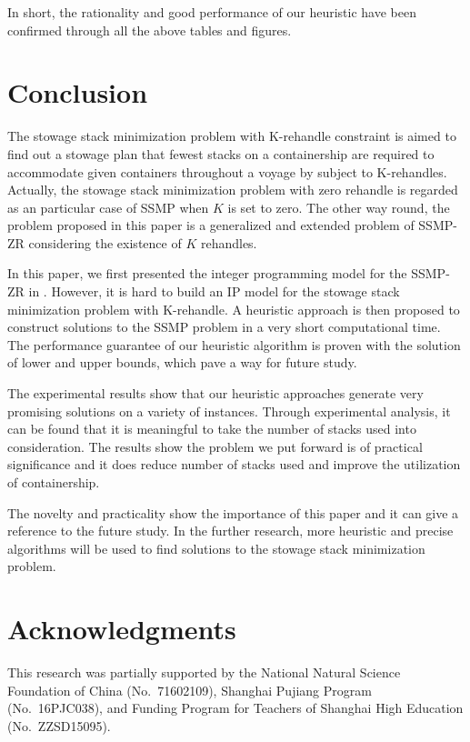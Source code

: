 \documentclass[review,3p,times,authoryear,12pt]{elsarticle}
\begin{document}
In short, the rationality and good performance of our heuristic have been confirmed through all the above tables and figures.

\section{Conclusion}
\label{sec:con}
The stowage stack minimization problem with K-rehandle constraint is aimed to find out a stowage plan that fewest stacks on a containership are required to accommodate given containers throughout a voyage by subject to K-rehandles.
Actually, the stowage stack minimization problem with zero rehandle is regarded as an particular case of SSMP when $K$ is set to zero.
The other way round, the problem proposed in this paper is a generalized and extended problem of SSMP-ZR considering the existence of $K$ rehandles.

In this paper, we first presented the integer programming model for the SSMP-ZR in \cite{wang2014stowage}.
However, it is hard to build an IP model for the stowage stack minimization problem with K-rehandle.
A heuristic approach is then proposed to construct solutions to the SSMP problem in a very short computational time.
The performance guarantee of our heuristic algorithm is proven with the solution of lower and upper bounds, which pave a way for future study.

The experimental results show that our heuristic approaches generate very promising solutions on a variety of instances.
Through experimental analysis, it can be found that it is meaningful to take the number of stacks used into consideration.
The results show the problem we put forward is of practical significance and it does reduce number of stacks used and improve the utilization of containership.

The novelty and practicality show the importance of this paper and it can give a reference to the future study.
In the further research, more heuristic and precise algorithms will be used to find solutions to the stowage stack minimization problem.

\section*{Acknowledgments}

This research was partially supported by the National Natural Science Foundation of China (No.\ 71602109), Shanghai Pujiang Program (No.\ 16PJC038), and Funding Program for Teachers of Shanghai High Education (No.\ ZZSD15095).



\end{document}
